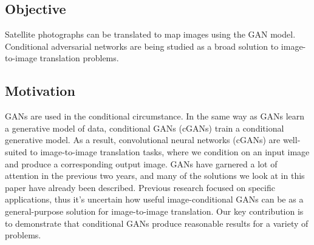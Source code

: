 \subsection{Objective}

\par Satellite photographs can be translated to map images using the GAN model. Conditional adversarial networks are being studied as a broad solution to image-to-image translation problems.



\subsection{Motivation}
\par GANs are used in the conditional circumstance. In the same way as GANs learn a generative model of data, conditional GANs (cGANs) train a conditional generative model. As a result, convolutional neural networks (cGANs) are well-suited to image-to-image translation tasks, where we condition on an input image and produce a corresponding output image.
GANs have garnered a lot of attention in the previous two years, and many of the solutions we look at in this paper have already been described. Previous research focused on specific applications, thus it's uncertain how useful image-conditional GANs can be as a general-purpose solution for image-to-image translation. Our key contribution is to demonstrate that conditional GANs produce reasonable results for a variety of problems.